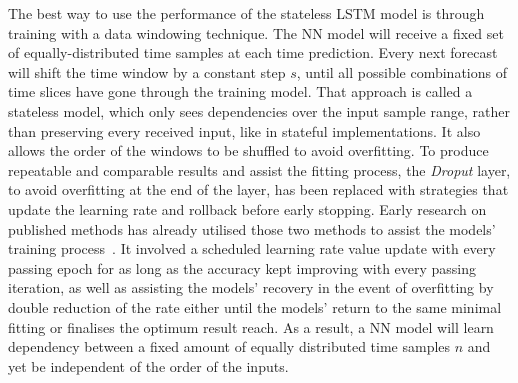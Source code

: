 %
%
The best way to use the performance of the stateless LSTM model is through training with a data windowing technique.
The NN model will receive a fixed set of equally-distributed time samples at each time prediction.
Every next forecast will shift the time window by a constant step $s$, until all possible combinations of time slices have gone through the training model.
That approach is called a stateless model, which only sees dependencies over the input sample range, rather than preserving every received input, like in stateful implementations.
It also allows the order of the windows to be shuffled to avoid overfitting.
To produce repeatable and comparable results and assist the fitting process, the \textit{Droput} layer, to avoid overfitting at the end of the layer, has been replaced with strategies that update the learning rate and rollback before early stopping.
{Early research on published methods has already utilised those two methods to assist the models' training process~\cite{sadykov_practical_2022}.
It involved a scheduled learning rate value update with every passing epoch for as long as the accuracy kept improving with every passing iteration, as well as assisting the models' recovery in the event of overfitting by double reduction of the rate either until the models' return to the same minimal fitting or finalises the optimum result reach.}
As a result, a NN model will learn dependency between a fixed amount of equally distributed time samples $n$ and yet be independent of the order of the inputs.

